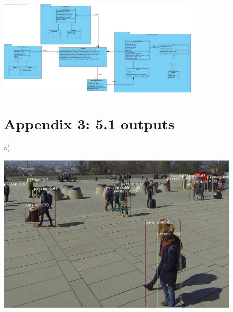 \documentclass[12pt]{report}
\begin{document}
\includegraphics[angle = 90,width=100mm]{./images/SD Class diagram.jpg}

\section*{Appendix 3: 5.1 outputs}

a)

\includegraphics[width=120mm]{./images/appendix/NMS0.6.PNG}
\end{document}
